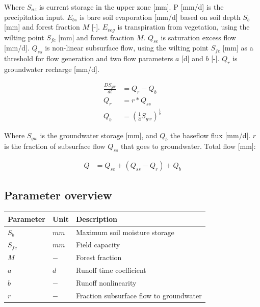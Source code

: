 Where $S_{uz}$ is current storage in the upper zone [mm]. 
P [mm/d] is the precipitation input. 
$E_{bs}$ is bare soil evaporation [mm/d] based on soil depth 
$S_b$ [mm] and forest fraction $M$ [-]. $E_{veg}$ is transpiration from vegetation, using the wilting point $S_{fc}$ [mm] and forest fraction $M$. $Q_{se}$ is saturation excess flow [mm/d]. 
$Q_{ss}$ is non-linear subsurface flow, using the wilting point $S_{fc}$ [mm] as a threshold for flow generation and two flow parameters $a$ [d] and $b$ [-]. $Q_r$ is groundwater recharge [mm/d].

\begin{align}
	\frac{DS_{gw}}{dt} &= Q_r-Q_b\\
	Q_r &= r*Q_{ss}\\
	Q_b &= \left(\frac{1}{a}S_{gw}\right)^{\frac{1}{b}}
\end{align}	

Where $S_{gw}$ is the groundwater storage [mm], and $Q_b$ the baseflow flux [mm/d]. $r$ is the fraction of subsurface flow $Q_{ss}$ that goes to groundwater. Total flow [mm]:

\begin{align}
	Q &= Q_{se} + (Q_{ss} - Q_r) + Q_b
\end{align}

\subsection{Parameter overview}
\begin{table}[htbp]
  \centering
    \begin{tabular}{lll}
    \toprule
    Parameter & Unit  & Description \\
    \midrule
    $S_b$ & $mm$  & Maximum soil moisture storage \\
    $S_{fc}$ & $mm$  & Field capacity \\
    $M$   & $-$   & Forest fraction \\
    $a$   & $d$   & Runoff time coefficient \\
    $b$   & $-$   & Runoff nonlinearity \\
    $r$   & $-$   & Fraction subsurface flow to groundwater \\
    \bottomrule
    \end{tabular}%
  \label{tab:addlabel}%
\end{table}%


